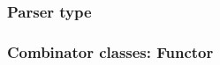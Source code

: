 \documentclass{beamer}
\begin{document}
\begin{frame}
  \frametitle{Parser type}


\end{frame}


\begin{frame}
  \frametitle{Combinator classes: Functor}




\end{frame}


%
%
\end{document}
